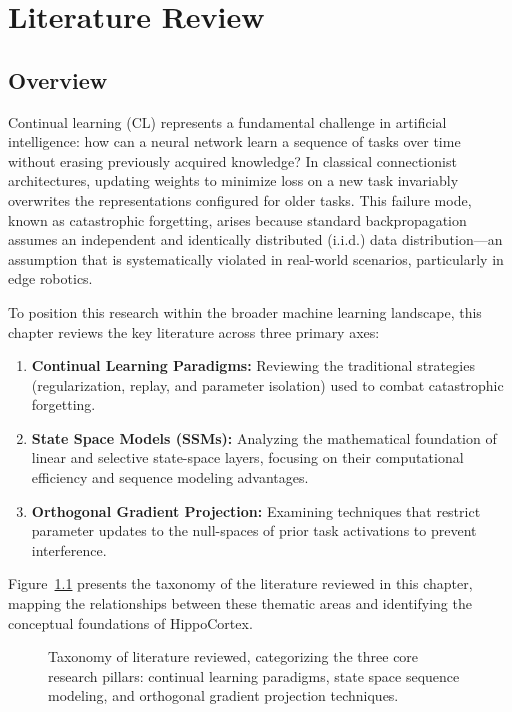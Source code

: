 

\chapter{Literature Review}
\label{chap:literature_review}

\section{Overview}
\label{sec:overview}

Continual learning (CL) represents a fundamental challenge in artificial intelligence: how can a neural network learn a sequence of tasks over time without erasing previously acquired knowledge? In classical connectionist architectures, updating weights to minimize loss on a new task invariably overwrites the representations configured for older tasks. This failure mode, known as catastrophic forgetting, arises because standard backpropagation assumes an independent and identically distributed (i.i.d.) data distribution---an assumption that is systematically violated in real-world scenarios, particularly in edge robotics.

To position this research within the broader machine learning landscape, this chapter reviews the key literature across three primary axes:
\begin{enumerate}
    \item \textbf{Continual Learning Paradigms:} Reviewing the traditional strategies (regularization, replay, and parameter isolation) used to combat catastrophic forgetting.
    \item \textbf{State Space Models (SSMs):} Analyzing the mathematical foundation of linear and selective state-space layers, focusing on their computational efficiency and sequence modeling advantages.
    \item \textbf{Orthogonal Gradient Projection:} Examining techniques that restrict parameter updates to the null-spaces of prior task activations to prevent interference.
\end{enumerate}

Figure~\ref{fig:literature_taxonomy} presents the taxonomy of the literature reviewed in this chapter, mapping the relationships between these thematic areas and identifying the conceptual foundations of HippoCortex.

\begin{figure}[ht]
    \centering
    
    \caption{Taxonomy of literature reviewed, categorizing the three core research pillars: continual learning paradigms, state space sequence modeling, and orthogonal gradient projection techniques.}
    \label{fig:literature_taxonomy}
\end{figure}

